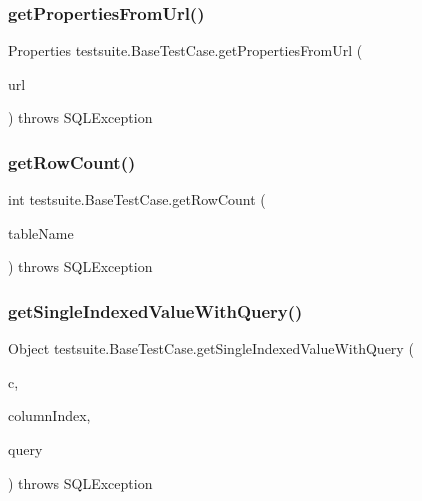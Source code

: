 \subsubsection{\texorpdfstring{get\+Properties\+From\+Url()}{getPropertiesFromUrl()}}
{\footnotesize\ttfamily Properties testsuite.\+Base\+Test\+Case.\+get\+Properties\+From\+Url (\begin{DoxyParamCaption}\item[{\mbox{\hyperlink{classcom_1_1mysql_1_1cj_1_1conf_1_1_connection_url}{Connection\+Url}}}]{url }\end{DoxyParamCaption}) throws S\+Q\+L\+Exception\hspace{0.3cm}{\ttfamily [protected]}}

\mbox{\label{classtestsuite_1_1_base_test_case_a6a6e1d72f46dd17581da3f719a72417a}} 
\subsubsection{\texorpdfstring{get\+Row\+Count()}{getRowCount()}}
{\footnotesize\ttfamily int testsuite.\+Base\+Test\+Case.\+get\+Row\+Count (\begin{DoxyParamCaption}\item[{String}]{table\+Name }\end{DoxyParamCaption}) throws S\+Q\+L\+Exception\hspace{0.3cm}{\ttfamily [protected]}}

\mbox{\label{classtestsuite_1_1_base_test_case_a0cafe07cb8206e968a45d675446f2e48}} 
\subsubsection{\texorpdfstring{get\+Single\+Indexed\+Value\+With\+Query()}{getSingleIndexedValueWithQuery()}\hspace{0.1cm}{\footnotesize\ttfamily [1/2]}}
{\footnotesize\ttfamily Object testsuite.\+Base\+Test\+Case.\+get\+Single\+Indexed\+Value\+With\+Query (\begin{DoxyParamCaption}\item[{Connection}]{c,  }\item[{int}]{column\+Index,  }\item[{String}]{query }\end{DoxyParamCaption}) throws S\+Q\+L\+Exception\hspace{0.3cm}{\ttfamily [protected]}}

